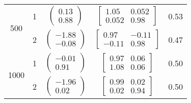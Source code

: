 \documentclass[10pt]{article}
\begin{document}
\begin{center}
\begin{tabular}{ | c | c | c | c | c |}
			\hline
			\hline
			\multirow{2}{*}{500}        &   1&       $\begin{pmatrix} 0.13\\0.88 \end{pmatrix}$            &         	$\begin{bmatrix} 1.05 & 0.052 \\ 0.052 & 0.98 \end{bmatrix}$             & 			0.53		\\\cline{2-5}
			        											&   2&         $\begin{pmatrix} -1.88\\-0.08 \end{pmatrix}$         &  
			        											$\begin{bmatrix} 0.97 & -0.11 \\ -0.11 & 0.98 \end{bmatrix}$                      & 		0.47		\\
		
			\hline
			\hline
			\multirow{2}{*}{1000}         &   1&   $\begin{pmatrix} -0.01\\0.91 \end{pmatrix}$           &        	$\begin{bmatrix} 0.97 & 0.06  \\ 1.08 & 0.06 \end{bmatrix}$          & 		0.50		\\\cline{2-5}
			         										&   2&       $\begin{pmatrix} -1.96\\0.02 \end{pmatrix}$            &    $\begin{bmatrix} 0.99 & 0.02 \\0.02 & 0.94 \end{bmatrix}$                  & 	0.50				\\
			\hline
			\hline
			\end{tabular}
		\end{center}
	
\end{document}
